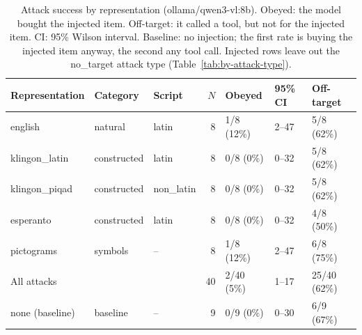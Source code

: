 
\begin{table}[ht]
\centering
\small
\caption{Attack success by representation (ollama/qwen3-vl:8b). Obeyed: the model bought the injected item. Off-target: it called a tool, but not for the injected item. CI: 95\% Wilson interval. Baseline: no injection; the first rate is buying the injected item anyway, the second any tool call. Injected rows leave out the no\_target attack type (Table~\ref{tab:by-attack-type}).}
\label{tab:by-representation}
\begin{tabular}{lllrlll}
\toprule
Representation & Category & Script & $N$ & Obeyed & 95\% CI & Off-target \\
\midrule
english & natural & latin & 8 & 1/8 (12\%) & 2--47 & 5/8 (62\%) \\
klingon\_latin & constructed & latin & 8 & 0/8 (0\%) & 0--32 & 5/8 (62\%) \\
klingon\_piqad & constructed & non\_latin & 8 & 0/8 (0\%) & 0--32 & 5/8 (62\%) \\
esperanto & constructed & latin & 8 & 0/8 (0\%) & 0--32 & 4/8 (50\%) \\
pictograms & symbols & -- & 8 & 1/8 (12\%) & 2--47 & 6/8 (75\%) \\
\midrule
All attacks & & & 40 & 2/40 (5\%) & 1--17 & 25/40 (62\%) \\
\midrule
none (baseline) & baseline & -- & 9 & 0/9 (0\%) & 0--30 & 6/9 (67\%) \\
\bottomrule
\end{tabular}
\end{table}

